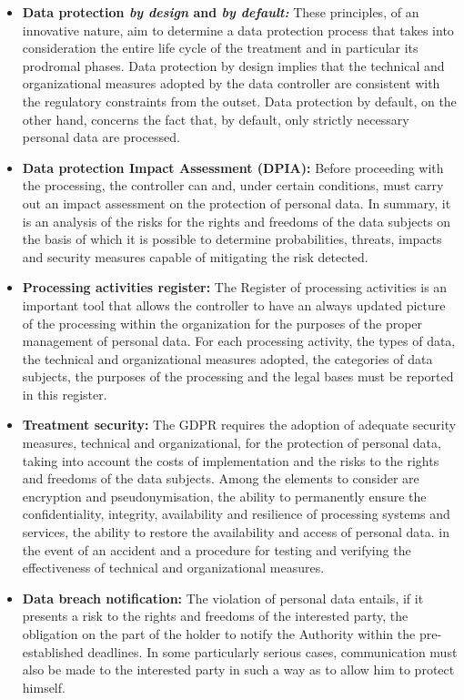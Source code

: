 \begin{itemize}
    \item \textbf{Data protection \textit{by design} and \textit{by default:}} These principles, of an innovative nature, aim to determine a data protection process that takes into consideration the entire life cycle of the treatment and in particular its prodromal phases. Data protection by design implies that the technical and organizational measures adopted by the data controller are consistent with the regulatory constraints from the outset. Data protection by default, on the other hand, concerns the fact that, by default, only strictly necessary personal data are processed.
    \item \textbf{Data protection Impact Assessment (DPIA):} Before proceeding with the processing, the controller can and, under certain conditions, must carry out an impact assessment on the protection of personal data. In summary, it is an analysis of the risks for the rights and freedoms of the data subjects on the basis of which it is possible to determine probabilities, threats, impacts and security measures capable of mitigating the risk detected.
    \item \textbf{Processing activities register:} The Register of processing activities is an important tool that allows the controller to have an always updated picture of the processing within the organization for the purposes of the proper management of personal data. For each processing activity, the types of data, the technical and organizational measures adopted, the categories of data subjects, the purposes of the processing and the legal bases must be reported in this register.
    \item \textbf{Treatment security:} The GDPR requires the adoption of adequate security measures, technical and organizational, for the protection of personal data, taking into account the costs of implementation and the risks to the rights and freedoms of the data subjects. Among the elements to consider are encryption and pseudonymisation, the ability to permanently ensure the confidentiality, integrity, availability and resilience of processing systems and services, the ability to restore the availability and access of personal data. in the event of an accident and a procedure for testing and verifying the effectiveness of technical and organizational measures.
    \item \textbf{Data breach notification:} The violation of personal data entails, if it presents a risk to the rights and freedoms of the interested party, the obligation on the part of the holder to notify the Authority within the pre-established deadlines. In some particularly serious cases, communication must also be made to the interested party in such a way as to allow him to protect himself.
\end{itemize}
